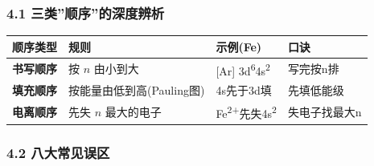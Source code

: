 \subsubsection{4.1 三类''顺序''的深度辨析}\label{ux4e09ux7c7bux987aux5e8fux7684ux6df1ux5ea6ux8fa8ux6790}

{\def\LTcaptype{none} %
\begin{longtable}[]{@{}
  >{\raggedright\arraybackslash}p{}
  >{\raggedright\arraybackslash}p{}
  >{\raggedright\arraybackslash}p{}
  >{\raggedleft\arraybackslash}p{}@{}}
\toprule\noalign{}
\begin{minipage}[b]{\linewidth}\raggedright
顺序类型
\end{minipage} & \begin{minipage}[b]{\linewidth}\raggedright
规则
\end{minipage} & \begin{minipage}[b]{\linewidth}\raggedright
示例(Fe)
\end{minipage} & \begin{minipage}[b]{\linewidth}\raggedleft
口诀
\end{minipage} \\
\midrule\noalign{}
\endhead
\bottomrule\noalign{}
\endlastfoot
\textbf{书写顺序} & 按 \(n\) 由小到大 & {[}Ar{]} 3d\textsuperscript{6}4s\textsuperscript{2} & 写完按n排 \\
\textbf{填充顺序} & 按能量由低到高(Pauling图) & 4s先于3d填 & 先填低能级 \\
\textbf{电离顺序} & 先失 \(n\) 最大的电子 & Fe\textsuperscript{2+}先失4s\textsuperscript{2} & 失电子找最大n \\
\end{longtable}
}

\subsubsection{4.2 八大常见误区}\label{ux516bux5927ux5e38ux89c1ux8befux533a}

